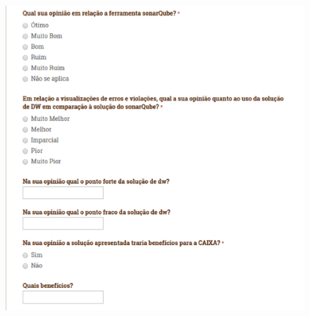 \begin{apendicesenv}
\begin{figure}[h!]
\centering
\includegraphics[keepaspectratio=false,scale=0.50]{figuras/figuras_nilton/questionario4.eps}
\label{questionario4}
\end{figure}

\end{apendicesenv}